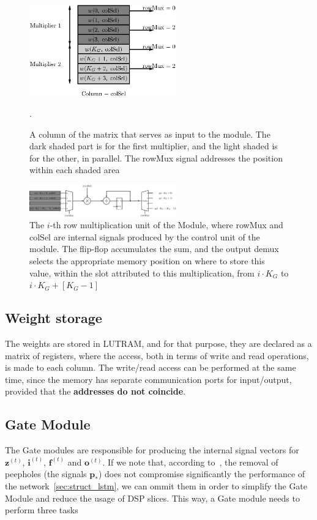 \documentclass{IEEEtran}
\newcommand{\mb}[1]{\mathbf{#1}}
\begin{document}
\begin{figure}
    \centering
    \includegraphics[width=2.5in]{figures/mem-array-prod.eps}
    \caption[A column of the matrix that serves as input to the module]{A column of the matrix that serves as input to the module. The dark shaded part is for the first multiplier, and the light shaded is for the other, in parallel. The rowMux signal addresses the position within each shaded area}.
    \label{fig:mem-arrayprod}
\end{figure}

\begin{figure}
    \centering
    \includegraphics[width=2.5in]{figures/array-prod.eps}
    \caption[The $i$-th row multiplication unit of the Module]{The $i$-th row multiplication unit of the Module, where rowMux and colSel are internal signals produced by the control unit of the module. The flip-flop accumulates the sum, and the output demux selects the appropriate memory position on where to store this value, within the slot attributed to this multiplication, from $i\cdot K_G$ to $i\cdot K_G + \left[K_G-1\right]$}
    \label{fig:array-prod}
\end{figure}

\subsection{Weight storage}\label{sec:proprarch_ram}
The weights are stored in LUTRAM, and for that purpose, they are declared as a matrix of registers, where the access, both in terms
of write and read operations, is made to each column. The write/read access can be performed at the same time, since the memory has
separate communication ports for input/output, provided that the \textbf{addresses do not coincide}.

\subsection{Gate Module}\label{sec:proparch_gate}
The Gate modules are responsible for producing the internal signal vectors for $\mb{z}^{(t)}$, $\mb{i}^{(t)}$, $\mb{f}^{(t)}$ and $\mb{o}^{(t)}$. If we note that, according to~\cite{Greff15}, the removal of peepholes (the signals $\mb{p}_*$) does not compromise significantly the performance of the network~\ref{sec:struct_lstm}, we can ommit them in order to simplify the Gate Module and reduce the usage of DSP slices. This way, a Gate module needs to perform three tasks
\end{document}

